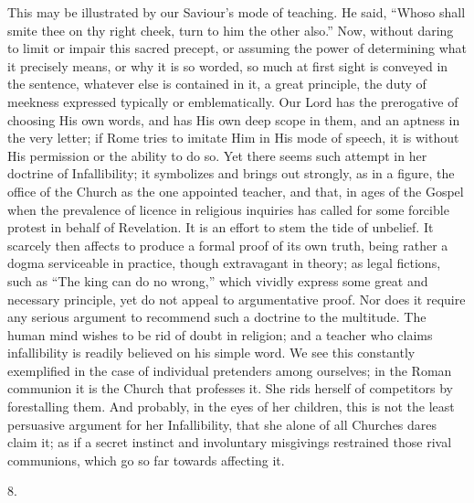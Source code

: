 This may be illustrated by our Saviour's mode of teaching. He said,
``Whoso shall smite thee on thy right cheek, turn to him the other
also.'' Now, without daring to limit or impair this sacred
precept, or assuming the power of determining what it precisely means,
or why it is so worded, so much at first sight is conveyed in the
sentence, whatever else is contained in it, a great principle, the
duty of meekness expressed typically or emblematically. Our Lord has
the prerogative of choosing His own words, and has His own deep
scope in them, and an aptness in the very letter; if Rome tries to
imitate Him in His mode of speech, it is without His permission or the
ability to do so. Yet there seems such attempt in her doctrine of
Infallibility; it symbolizes and brings out strongly, as in a figure,
the office of the Church as the one appointed teacher, and that, in
ages of the Gospel when the prevalence of licence in religious
inquiries has called for some forcible protest in behalf of
Revelation. It is an effort to stem the tide of unbelief. It scarcely
then affects to produce a formal proof of its own truth, being rather
a dogma serviceable in practice, though extravagant in theory; as
legal fictions, such as ``The king can do no wrong,'' which
vividly express some great and necessary principle, yet do not appeal
to argumentative proof. Nor does it require any serious argument to
recommend such a doctrine to the multitude. The human mind wishes to
be rid of doubt in religion; and a teacher who claims infallibility is
readily believed on his simple word. We see this constantly
exemplified in the case of individual pretenders among ourselves; in
the Roman communion it is the Church that professes it. She rids
herself of competitors by forestalling them. And probably, in the eyes
of her children, this is not the least persuasive argument for her
Infallibility, that she alone of all Churches dares claim it; as if a
secret instinct and involuntary misgivings restrained those rival
communions, which go so far towards affecting it.

8.


